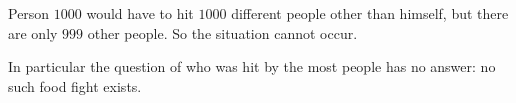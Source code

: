 Person $1000$ would have to hit $1000$ different people other than himself, but there are only $999$ other people. So the situation cannot occur.

In particular the question of who was hit by the most people has no answer: no such food fight exists.
